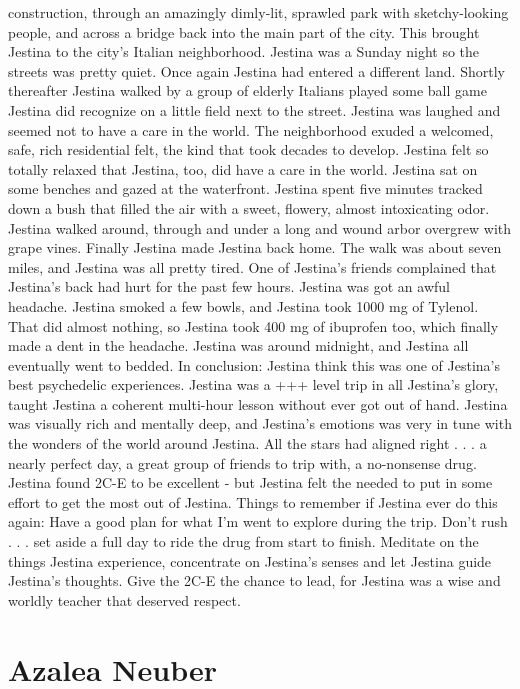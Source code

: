 \documentclass[12pt]{book}
\begin{document}
construction, through an amazingly dimly-lit, sprawled park with sketchy-looking people, and across a bridge back into the main part of the city. This brought Jestina to the city's Italian neighborhood. Jestina was a Sunday night so the streets was pretty quiet. Once again Jestina had entered a different land. Shortly thereafter Jestina walked by a group of elderly Italians played some ball game Jestina did recognize on a little field next to the street. Jestina was laughed and seemed not to have a care in the world. The neighborhood exuded a welcomed, safe, rich residential felt, the kind that took decades to develop. Jestina felt so totally relaxed that Jestina, too, did have a care in the world. Jestina sat on some benches and gazed at the waterfront. Jestina spent five minutes tracked down a bush that filled the air with a sweet, flowery, almost intoxicating odor. Jestina walked around, through and under a long and wound arbor overgrew with grape vines. Finally Jestina made Jestina back home. The walk was about seven miles, and Jestina was all pretty tired. One of Jestina's friends complained that Jestina's back had hurt for the past few hours. Jestina was got an awful headache. Jestina smoked a few bowls, and Jestina took 1000 mg of Tylenol. That did almost nothing, so Jestina took 400 mg of ibuprofen too, which finally made a dent in the headache. Jestina was around midnight, and Jestina all eventually went to bedded. In conclusion: Jestina think this was one of Jestina's best psychedelic experiences. Jestina was a +++ level trip in all Jestina's glory, taught Jestina a coherent multi-hour lesson without ever got out of hand. Jestina was visually rich and mentally deep, and Jestina's emotions was very in tune with the wonders of the world around Jestina. All the stars had aligned right . . .  a nearly perfect day, a great group of friends to trip with, a no-nonsense drug. Jestina found 2C-E to be excellent - but Jestina felt the needed to put in some effort to get the most out of Jestina. Things to remember if Jestina ever do this again: Have a good plan for what I'm went to explore during the trip. Don't rush . . .  set aside a full day to ride the drug from start to finish. Meditate on the things Jestina experience, concentrate on Jestina's senses and let Jestina guide Jestina's thoughts. Give the 2C-E the chance to lead, for Jestina was a wise and worldly teacher that deserved respect.






\chapter{Azalea Neuber}
\end{document}
